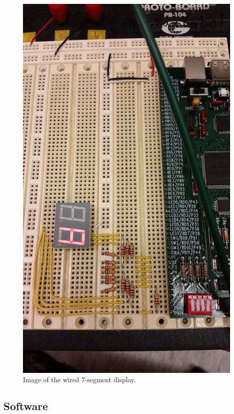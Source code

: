 \documentclass[11pt]{article}
\begin{document}
\begin{figure}[h!]
\centering
\includegraphics[scale=0.1]{seven_segment_image.jpg}
\caption{Image of the wired 7-segment display.}
\label{figure:seven_segment_image}
\end{figure} 

\clearpage

\subsection{Software}
\end{document}
